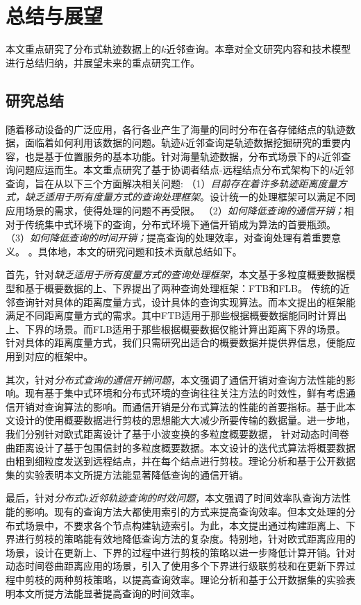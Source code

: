 \chapter{总结与展望}

本文重点研究了分布式轨迹数据上的$k$近邻查询。本章对全文研究内容和技术模型进行总结归纳，并展望未来的重点研究工作。

\section{研究总结}

随着移动设备的广泛应用，各行各业产生了海量的同时分布在各存储结点的轨迹数据，面临着如何利用该数据的问题。轨迹$k$近邻查询是轨迹数据挖掘研究的重要内容，也是基于位置服务的基本功能。针对海量轨迹数据，分布式场景下的$k$近邻查询问题应运而生。本文重点研究了基于协调者结点-远程结点分布式架构下的$k$近邻查询，旨在从以下三个方面解决相关问题:
（1）\textit{目前存在着许多轨迹距离度量方式，缺乏适用于所有度量方式的查询处理框架}。设计统一的处理框架可以满足不同应用场景的需求，使得处理的问题不再受限。
（2）\textit{如何降低查询的通信开销；}相对于传统集中式环境下的查询，分布式环境下通信开销成为算法的首要瓶颈。
（3）\textit{如何降低查询的时间开销；}提高查询的处理效率，对查询处理有着重要意义。
。具体地，本文的研究问题和技术贡献总结如下。

首先，针对\textit{缺乏适用于所有度量方式的查询处理框架}，本文基于多粒度概要数据模型和基于概要数据的上、下界提出了两种查询处理框架：FTB和FLB。 传统的近邻查询针对具体的距离度量方式，设计具体的查询实现算法。而本文提出的框架能满足不同距离度量方式的需求。其中FTB适用于那些根据概要数据能同时计算出上、下界的场景。而FLB适用于那些根据概要数据仅能计算出距离下界的场景。
针对具体的距离度量方式，我们只需研究出适合的概要数据并提供界信息，便能应用到对应的框架中。

其次，针对\textit{分布式查询的通信开销问题}，本文强调了通信开销对查询方法性能的影响。现有基于集中式环境和分布式环境的查询往往关注方法的时效性，鲜有考虑通信开销对查询算法的影响。而通信开销是分布式算法的性能的首要指标。基于此本文设计的使用概要数据进行剪枝的思想能大大减少所要传输的数据量。进一步地，我们分别针对欧式距离设计了基于小波变换的多粒度概要数据，
针对动态时间卷曲距离设计了基于包围信封的多粒度概要数据。本文设计的迭代式算法将概要数据由粗到细粒度发送到远程结点，并在每个结点进行剪枝。理论分析和基于公开数据集的实验表明本文所提方法能显著降低查询的通信开销。
	
最后，针对\textit{分布式$k$近邻轨迹查询的时效问题}，本文强调了时间效率队查询方法性能的影响。现有的查询方法大都使用索引的方式来提高查询效率。但本文处理的分布式场景中，不要求各个节点构建轨迹索引。为此，本文提出通过构建距离上、下界进行剪枝的策略能有效地降低查询方法的复杂度。特别地，针对欧式距离应用的场景，设计在更新上、下界的过程中进行剪枝的策略以进一步降低计算开销。针对动态时间卷曲距离应用的场景，引入了使用多个下界进行级联剪枝和在更新下界过程中剪枝的两种剪枝策略，以提高查询效率。理论分析和基于公开数据集的实验表明本文所提方法能显著提高查询的时间效率。

